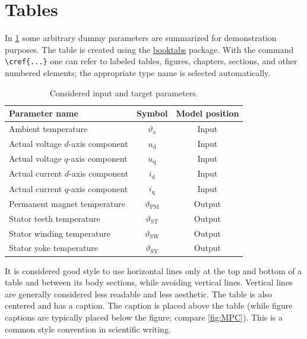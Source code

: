 \section{Tables}
\label{sec:features}
In \cref{tab:params} some arbitrary dummy parameters are summarized for demonstration purposes. The table is created using the \href{https://ctan.org/pkg/booktabs}{booktabs} package. With the command \verb|\cref{...}| one can refer to labeled tables, figures, chapters, sections, and other numbered elements; the appropriate type name is selected automatically.
\begin{table}[htb]
	\caption{Considered input and target parameters.}
	\label{tab:params}
	\centering
	\begin{tabular}{l c c}
		\toprule
		Parameter name                    & Symbol                    & Model position \\
		\midrule
		Ambient temperature               & $\vartheta_\mathrm{a}$    & Input          \\
		Actual voltage $d$-axis component & $u_\mathrm{d}$            & Input          \\
		Actual voltage $q$-axis component & $u_\mathrm{q}$            & Input          \\
		Actual current $d$-axis component & $i_\mathrm{d}$            & Input          \\
		Actual current $q$-axis component & $i_\mathrm{q}$            & Input          \\
		\midrule
		Permanent magnet temperature      & $\vartheta_{\mathrm{PM}}$ & Output         \\
		Stator teeth temperature          & $\vartheta_{\mathrm{ST}}$ & Output         \\
		Stator winding temperature        & $\vartheta_{\mathrm{SW}}$ & Output         \\
		Stator yoke temperature           & $\vartheta_{\mathrm{SY}}$ & Output         \\
		\bottomrule
	\end{tabular}
\end{table}

It is considered good style to use horizontal lines only at the top and bottom of a table and between its body sections, while avoiding vertical lines. Vertical lines are generally considered less readable and less aesthetic. The table is also centered and has a caption. The caption is placed above the table (while figure captions are typically placed below the figure; compare \cref{fig:MPC}). This is a common style convention in scientific writing.

